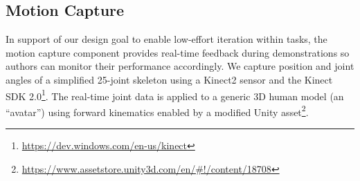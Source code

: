 
\subsection{Motion Capture}

In support of our design goal to enable low-effort iteration within tasks, the motion capture component provides real-time feedback during demonstrations so authors can monitor their performance accordingly.
%
We capture position and joint angles of a simplified 25-joint skeleton using a Kinect2 sensor and the Kinect SDK 2.0\footnote{\url{https://dev.windows.com/en-us/kinect}}.
%
The real-time joint data is applied to a generic 3D human model (an ``avatar'') using forward kinematics enabled by a modified Unity asset\footnote{\url{https://www.assetstore.unity3d.com/en/\#!/content/18708}}.

